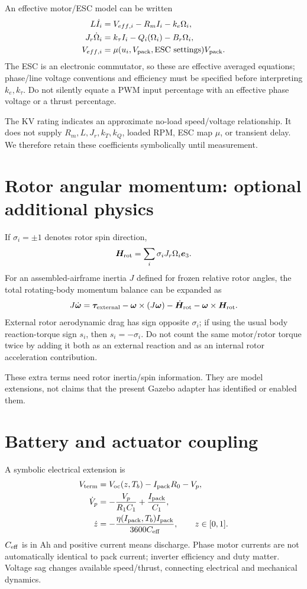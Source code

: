 An effective motor/ESC model can be written
\begin{align}
L\dot I_i&=V_{{eff},i}-R_m I_i-k_e\Omega_i,\\
J_r\dot\Omega_i&=k_\tau I_i-Q_i(\Omega_i)-B_r\Omega_i,\\
V_{{eff},i}&=\mu(u_i,V_{\rm pack},\hbox{ESC settings})V_{\rm pack}.
\end{align}
The ESC is an electronic commutator, so these are effective averaged equations;
phase/line voltage conventions and efficiency must be specified before interpreting
$k_e,k_\tau$. Do not silently equate a PWM input percentage with an effective
phase voltage or a thrust percentage.

The KV rating indicates an approximate no-load speed/voltage relationship.
It does not supply $R_m,L,J_r,k_T,k_Q$, loaded RPM, ESC map $\mu$, or transient
delay. We therefore retain these coefficients symbolically until measurement.

\section{Rotor angular momentum: optional additional physics}
If $\sigma_i=\pm1$ denotes rotor spin direction,
\begin{equation}
\bm{H}_{\rm rot}=\sum_i\sigma_iJ_r\Omega_i\bm{e}_3.
\end{equation}
For an assembled-airframe inertia $J$ defined for frozen relative rotor angles,
the total rotating-body momentum balance can be expanded as
\begin{equation}
J\dot{\bm{\omega}}
=\bm{\tau}_{\rm external}
-\bm{\omega}\times(J\bm{\omega})
-\dot{\bm{H}}_{\rm rot}
-\bm{\omega}\times\bm{H}_{\rm rot}.
\end{equation}
External rotor aerodynamic drag has sign opposite $\sigma_i$; if using the
usual body reaction-torque sign $s_i$, then $s_i=-\sigma_i$.
Do not count the same motor/rotor torque twice by adding it both as an external
reaction and as an internal rotor acceleration contribution.

These extra terms need rotor inertia/spin information. They are model extensions,
not claims that the present Gazebo adapter has identified or enabled them.

\section{Battery and actuator coupling}
A symbolic electrical extension is
\begin{align}
V_{\rm term}&=V_{\rm oc}(z,T_b)-I_{\rm pack}R_0-V_p,\\
\dot V_p&=-\frac{V_p}{R_1C_1}+\frac{I_{\rm pack}}{C_1},\\
\dot z&=-\frac{\eta(I_{\rm pack},T_b)I_{\rm pack}}{3600C_{\rm eff}},
\qquad z\in[0,1].
\end{align}
$C_{\rm eff}$ is in Ah and positive current means discharge. Phase motor currents
are not automatically identical to pack current; inverter efficiency and duty
matter. Voltage sag changes available speed/thrust, connecting electrical and
mechanical dynamics.

